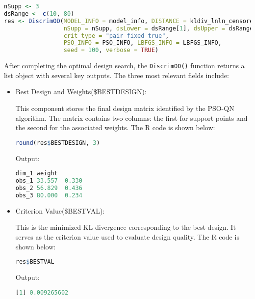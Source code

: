 \begin{lstlisting}[language=R, caption={Running DiscrimOD to Obtain the Optimal Design}]
nSupp <- 3
dsRange <- c(10, 80)
res <- DiscrimOD(MODEL_INFO = model_info, DISTANCE = kldiv_lnln_censored5000,
                 nSupp = nSupp, dsLower = dsRange[1], dsUpper = dsRange[2],
                 crit_type = "pair_fixed_true",
                 PSO_INFO = PSO_INFO, LBFGS_INFO = LBFGS_INFO,
                 seed = 100, verbose = TRUE)
\end{lstlisting}

After completing the optimal design search, the \verb|DiscrimOD()| function returns a list object with several key outputs. The three most relevant fields include:

\begin{itemize}
\item Best Design and Weights(\$BESTDESIGN):

This component stores the final design matrix identified by the PSO-QN algorithm. The matrix contains two columns: the first for support points and the second for the associated weights. The R code is shown below:

\begin{lstlisting}[language=R, caption={Best design and weights}]
round(res$BESTDESIGN, 3)
\end{lstlisting}

Output:

\begin{lstlisting}[language=R, caption={The Output of Best design and weights}]
       dim_1 weight
obs_1 33.557  0.330
obs_2 56.829  0.436
obs_3 80.000  0.234
\end{lstlisting}

\item Criterion Value(\$BESTVAL):

This is the minimized KL divergence corresponding to the best design. It serves as the criterion value used to evaluate design quality. The R code is shown below:

\begin{lstlisting}[language=R, caption={KL criterion value of the best design}]
res$BESTVAL
\end{lstlisting}

Output:

\begin{lstlisting}[language=R, caption={The Output of KL criterion value of the best design}]
[1] 0.009265602
\end{lstlisting}


\end{itemize}
